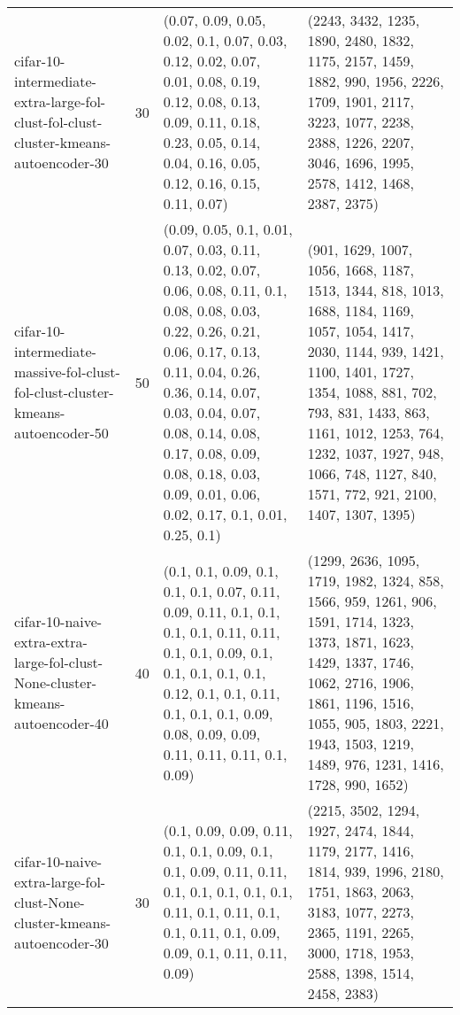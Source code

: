 \begin{longtable}{llll}
                          cifar-10-intermediate-extra-large-fol-clust-fol-clust-cluster-kmeans-autoencoder-30 &             30 &                                                                                                                       (0.07, 0.09, 0.05, 0.02, 0.1, 0.07, 0.03, 0.12, 0.02, 0.07, 0.01, 0.08, 0.19, 0.12, 0.08, 0.13, 0.09, 0.11, 0.18, 0.23, 0.05, 0.14, 0.04, 0.16, 0.05, 0.12, 0.16, 0.15, 0.11, 0.07) &                                                                                                                       (2243, 3432, 1235, 1890, 2480, 1832, 1175, 2157, 1459, 1882, 990, 1956, 2226, 1709, 1901, 2117, 3223, 1077, 2238, 2388, 1226, 2207, 3046, 1696, 1995, 2578, 1412, 1468, 2387, 2375) \\
                              cifar-10-intermediate-massive-fol-clust-fol-clust-cluster-kmeans-autoencoder-50 &             50 &  (0.09, 0.05, 0.1, 0.01, 0.07, 0.03, 0.11, 0.13, 0.02, 0.07, 0.06, 0.08, 0.11, 0.1, 0.08, 0.08, 0.03, 0.22, 0.26, 0.21, 0.06, 0.17, 0.13, 0.11, 0.04, 0.26, 0.36, 0.14, 0.07, 0.03, 0.04, 0.07, 0.08, 0.14, 0.08, 0.17, 0.08, 0.09, 0.08, 0.18, 0.03, 0.09, 0.01, 0.06, 0.02, 0.17, 0.1, 0.01, 0.25, 0.1) &            (901, 1629, 1007, 1056, 1668, 1187, 1513, 1344, 818, 1013, 1688, 1184, 1169, 1057, 1054, 1417, 2030, 1144, 939, 1421, 1100, 1401, 1727, 1354, 1088, 881, 702, 793, 831, 1433, 863, 1161, 1012, 1253, 764, 1232, 1037, 1927, 948, 1066, 748, 1127, 840, 1571, 772, 921, 2100, 1407, 1307, 1395) \\
                                cifar-10-naive-extra-extra-large-fol-clust-None-cluster-kmeans-autoencoder-40 &             40 &                                                                                (0.1, 0.1, 0.09, 0.1, 0.1, 0.1, 0.07, 0.11, 0.09, 0.11, 0.1, 0.1, 0.1, 0.1, 0.11, 0.11, 0.1, 0.1, 0.09, 0.1, 0.1, 0.1, 0.1, 0.1, 0.12, 0.1, 0.1, 0.11, 0.1, 0.1, 0.1, 0.09, 0.08, 0.09, 0.09, 0.11, 0.11, 0.11, 0.1, 0.09) &                                                                (1299, 2636, 1095, 1719, 1982, 1324, 858, 1566, 959, 1261, 906, 1591, 1714, 1323, 1373, 1871, 1623, 1429, 1337, 1746, 1062, 2716, 1906, 1861, 1196, 1516, 1055, 905, 1803, 2221, 1943, 1503, 1219, 1489, 976, 1231, 1416, 1728, 990, 1652) \\
                                      cifar-10-naive-extra-large-fol-clust-None-cluster-kmeans-autoencoder-30 &             30 &                                                                                                                                     (0.1, 0.09, 0.09, 0.11, 0.1, 0.1, 0.09, 0.1, 0.1, 0.09, 0.11, 0.11, 0.1, 0.1, 0.1, 0.1, 0.1, 0.11, 0.1, 0.11, 0.1, 0.1, 0.11, 0.1, 0.09, 0.09, 0.1, 0.11, 0.11, 0.09) &                                                                                                                       (2215, 3502, 1294, 1927, 2474, 1844, 1179, 2177, 1416, 1814, 939, 1996, 2180, 1751, 1863, 2063, 3183, 1077, 2273, 2365, 1191, 2265, 3000, 1718, 1953, 2588, 1398, 1514, 2458, 2383) \\

\end{longtable}
